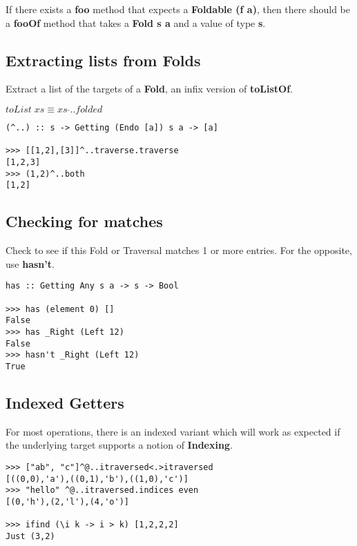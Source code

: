 \begin{multicols}{2}
\begin{box1}
If there exists a \textbf{foo} method that expects a
\textbf{Foldable (f a)}, then there should be a \textbf{fooOf} method that
takes a \textbf{Fold s a} and a value of type \textbf{s}.

\end{box1}

\begin{box2}
\subsection *{Extracting lists from Folds}

Extract a list of the targets of a \textbf{Fold}, an infix version of
\textbf{toListOf}.

$ toList\;xs \equiv xs\;\hat{}.. folded $

\begin{verbatim}
(^..) :: s -> Getting (Endo [a]) s a -> [a] 

>>> [[1,2],[3]]^..traverse.traverse
[1,2,3]
>>> (1,2)^..both
[1,2]
\end{verbatim}
\end{box2}

\begin{box1}
\subsection *{Checking for matches}

Check to see if this Fold or Traversal matches 1 or more entries. For the
opposite, use \textbf{hasn't}.

\begin{verbatim}
has :: Getting Any s a -> s -> Bool

>>> has (element 0) []
False
>>> has _Right (Left 12)
False
>>> hasn't _Right (Left 12)
True
\end{verbatim}
\end{box1}


\begin{box2}
\subsection*{Indexed Getters}
For most operations, there is an indexed variant which will work as expected if
the underlying target supports a notion of \textbf{Indexing}.

\begin{verbatim}
>>> ["ab", "c"]^@..itraversed<.>itraversed  
[((0,0),'a'),((0,1),'b'),((1,0),'c')]
>>> "hello" ^@..itraversed.indices even
[(0,'h'),(2,'l'),(4,'o')]

>>> ifind (\i k -> i > k) [1,2,2,2]
Just (3,2)
\end{verbatim}
\end{box2}
\end{multicols}
\newpage

